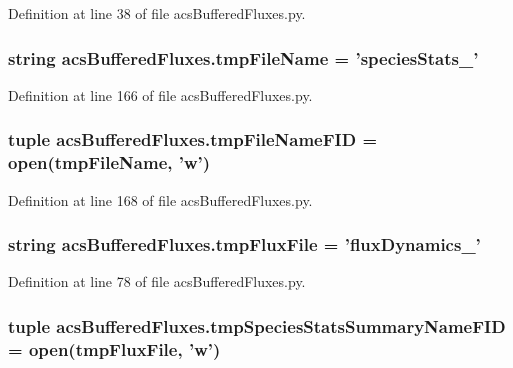 Definition at line 38 of file acs\-Buffered\-Fluxes.\-py.

\hypertarget{a00092_ae8f3277c929e5b042e62360eaffe3f22}{
\subsubsection[{tmp\-File\-Name}]{\setlength{\rightskip}{0pt plus 5cm}string acs\-Buffered\-Fluxes.\-tmp\-File\-Name = 'species\-Stats\-\_\-'}}\label{a00092_ae8f3277c929e5b042e62360eaffe3f22}


Definition at line 166 of file acs\-Buffered\-Fluxes.\-py.

\hypertarget{a00092_ad593217d9c7c4bdbdc2bbac8cec07790}{
\subsubsection[{tmp\-File\-Name\-F\-I\-D}]{\setlength{\rightskip}{0pt plus 5cm}tuple acs\-Buffered\-Fluxes.\-tmp\-File\-Name\-F\-I\-D = open({\bf tmp\-File\-Name}, 'w')}}\label{a00092_ad593217d9c7c4bdbdc2bbac8cec07790}


Definition at line 168 of file acs\-Buffered\-Fluxes.\-py.

\hypertarget{a00092_a170166907641e54151f8d83d51420165}{
\subsubsection[{tmp\-Flux\-File}]{\setlength{\rightskip}{0pt plus 5cm}string acs\-Buffered\-Fluxes.\-tmp\-Flux\-File = 'flux\-Dynamics\-\_\-'}}\label{a00092_a170166907641e54151f8d83d51420165}


Definition at line 78 of file acs\-Buffered\-Fluxes.\-py.

\hypertarget{a00092_a0b5b14621851cbf162c61aa936ca5f2d}{
\subsubsection[{tmp\-Species\-Stats\-Summary\-Name\-F\-I\-D}]{\setlength{\rightskip}{0pt plus 5cm}tuple acs\-Buffered\-Fluxes.\-tmp\-Species\-Stats\-Summary\-Name\-F\-I\-D = open({\bf tmp\-Flux\-File}, 'w')}}\label{a00092_a0b5b14621851cbf162c61aa936ca5f2d}


